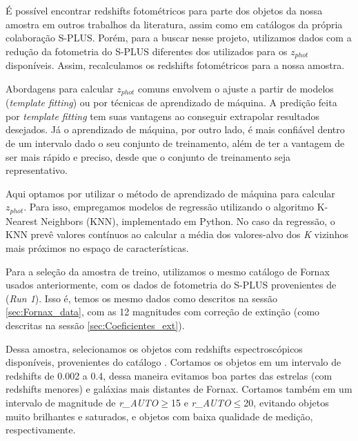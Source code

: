 \vspace{\baselineskip}

É possível encontrar redshifts fotométricos para parte dos objetos da nossa amostra em outros trabalhos da literatura, assim como em catálogos da própria colaboração S-PLUS. Porém, para a buscar nesse projeto, utilizamos dados com a redução da fotometria do S-PLUS diferentes dos utilizados para os \textit{$z_{phot}$} disponíveis. Assim, recalculamos os redshifts fotométricos para a nossa amostra.

\vspace{\baselineskip}

Abordagens para calcular \textit{$z_{phot}$} comuns envolvem o ajuste a partir de modelos (\textit{template fitting}) ou por técnicas de aprendizado de máquina. A predição feita por \textit{template fitting} tem suas vantagens ao conseguir extrapolar resultados desejados. Já o aprendizado de máquina, por outro lado, é mais confiável dentro de um intervalo dado o seu conjunto de treinamento, além de ter a vantagem de ser mais rápido e preciso, desde que o conjunto de treinamento seja representativo.

\vspace{\baselineskip}

Aqui optamos por utilizar o método de aprendizado de máquina para calcular \textit{$z_{phot}$}. Para isso, empregamos modelos de regressão utilizando o algoritmo K-Nearest Neighbors (KNN), implementado em Python. No caso da regressão, o KNN prevê valores contínuos ao calcular a média dos valores-alvo dos \textit{K} vizinhos mais próximos no espaço de características.

\vspace{\baselineskip}

Para a seleção da amostra de treino, utilizamos o mesmo catálogo de Fornax usados anteriormente, com os dados de fotometria do S-PLUS provenientes de \cite{haack2024splusfornaxprojectsfp} (\textit{Run 1}). Isso é, temos os mesmo dados como descritos na sessão \ref{sec:Fornax_data}, com as 12 magnitudes com correção de extinção (como descritas na sessão \ref{sec:Coeficientes_ext}).

\vspace{\baselineskip}

Dessa amostra, selecionamos os objetos com redshifts espectroscópicos disponíveis, provenientes do catálogo \cite{Lima_2024}. Cortamos os objetos em um intervalo de redshifts de 0.002 a 0.4, dessa maneira evitamos boa partes das estrelas (com redshifts menores) e galáxias mais distantes de Fornax. Cortamos também em um intervalo de magnitude de \textit{r\_AUTO}$\geq$15 e \textit{r\_AUTO}$\leq$20, evitando objetos muito brilhantes e saturados, e objetos com baixa qualidade de medição, respectivamente. 

